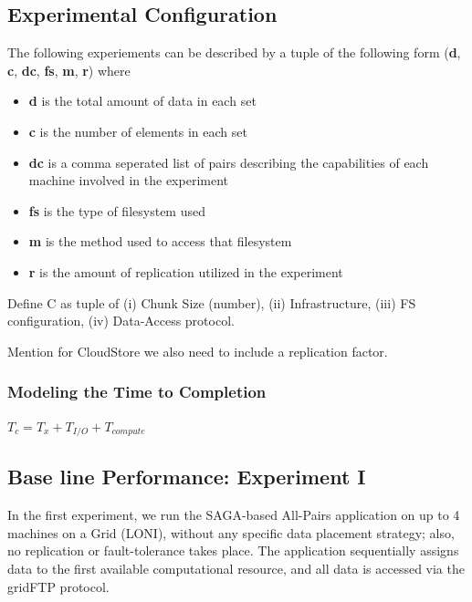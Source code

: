 \documentclass{rspublic}
\begin{document}
\subsection{Experimental Configuration}

The following experiements can be described by a tuple of the following form
(\textbf{d}, \textbf{c}, \textbf{dc}, \textbf{fs}, \textbf{m}, \textbf{r})
where

\begin{itemize} 
\item \textbf{d} is the total amount of data in each set
\item \textbf{c} is the number of elements in each set
\item \textbf{dc} is a comma seperated list of pairs describing the
capabilities of each machine involved in the experiment
\item \textbf{fs} is the type of filesystem used
\item \textbf{m} is the method used to access that filesystem
\item \textbf{r} is the amount of replication utilized in the experiment
\end{itemize}

Define C as  tuple of (i) Chunk Size (number), (ii) Infrastructure,
(iii) FS configuration, (iv) Data-Access protocol.

Mention for CloudStore we also need to include a replication factor.

\subsubsection{Modeling the Time to Completion}

$T_c = T_x + T_{I/O} + T_{compute}$

\subsection{Base line Performance: Experiment I} In the first experiment, we run the
SAGA-based All-Pairs application on up to 4 machines on a Grid (LONI),
without any specific data placement strategy; also, no replication or
fault-tolerance takes place.  The application sequentially assigns
data to the first available computational resource, and all data is
accessed via the gridFTP protocol.
\end{document}
